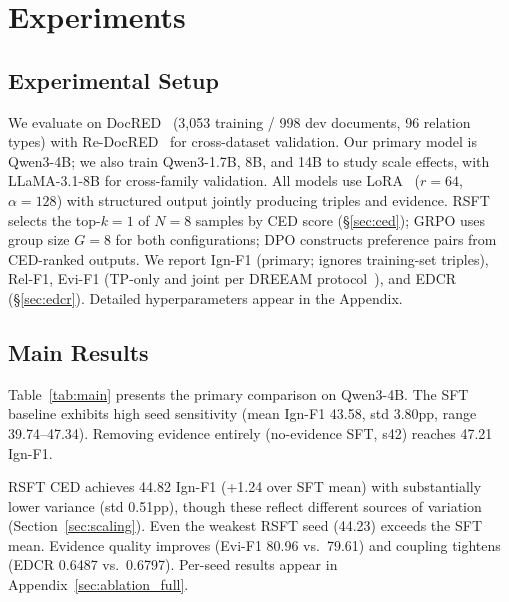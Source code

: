 \section{Experiments}
\label{sec:experiments}

\subsection{Experimental Setup}
\label{sec:setup}

We evaluate on DocRED~\citep{yao2019docred} (3,053 training / 998 dev documents, 96 relation types) with Re-DocRED~\citep{tan2022redocred} for cross-dataset validation. Our primary model is Qwen3-4B; we also train Qwen3-1.7B, 8B, and 14B to study scale effects, with LLaMA-3.1-8B for cross-family validation. All models use LoRA~\citep{hu2022lora} ($r{=}64$, $\alpha{=}128$) with structured output jointly producing triples and evidence. RSFT selects the top-$k{=}1$ of $N{=}8$ samples by CED score (\S\ref{sec:ced}); GRPO uses group size $G{=}8$ for both configurations; DPO constructs preference pairs from CED-ranked outputs. We report Ign-F1 (primary; ignores training-set triples), Rel-F1, Evi-F1 (TP-only and joint per DREEAM protocol~\citep{ma2023dreeam}), and EDCR (\S\ref{sec:edcr}). Detailed hyperparameters appear in the Appendix.


\subsection{Main Results}
\label{sec:main_results}

Table~\ref{tab:main} presents the primary comparison on Qwen3-4B. The SFT baseline exhibits high seed sensitivity (mean Ign-F1 43.58, std 3.80pp, range 39.74--47.34). Removing evidence entirely (no-evidence SFT, s42) reaches 47.21 Ign-F1.

RSFT CED achieves 44.82 Ign-F1 (+1.24 over SFT mean) with substantially lower variance (std 0.51pp), though these reflect different sources of variation (Section~\ref{sec:scaling}). Even the weakest RSFT seed (44.23) exceeds the SFT mean. Evidence quality improves (Evi-F1 80.96 vs.\ 79.61) and coupling tightens (EDCR 0.6487 vs.\ 0.6797). Per-seed results appear in Appendix~\ref{sec:ablation_full}.

